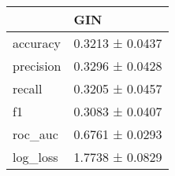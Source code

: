 \begin{tabular}{ll}
\toprule
 & GIN \\
\midrule
accuracy & 0.3213 ± 0.0437 \\
precision & 0.3296 ± 0.0428 \\
recall & 0.3205 ± 0.0457 \\
f1 & 0.3083 ± 0.0407 \\
roc_auc & 0.6761 ± 0.0293 \\
log_loss & 1.7738 ± 0.0829 \\
\bottomrule
\end{tabular}
